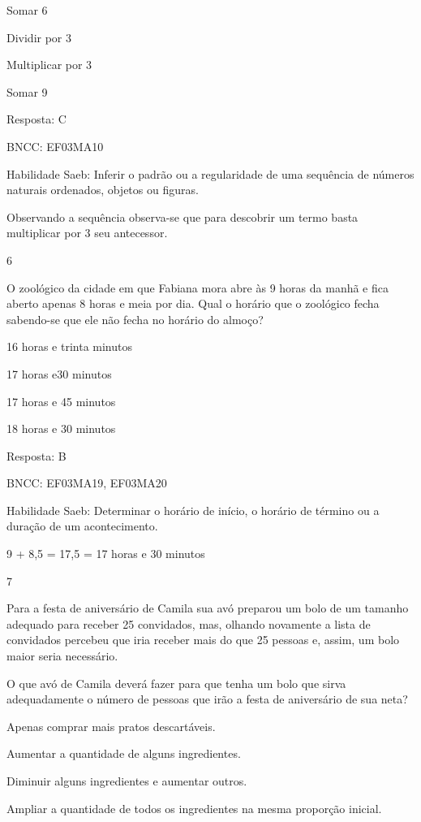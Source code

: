 \begin{escolha}
\begin{escolha}
\begin{escolha}
\item
  Somar 6
\item
  Dividir por 3
\item
  Multiplicar por 3
\item
  Somar 9
\end{escolha}

Resposta: C

BNCC: EF03MA10

Habilidade Saeb: Inferir o padrão ou a regularidade de uma sequência de
números naturais ordenados, objetos ou figuras.

Observando a sequência observa-se que para descobrir um termo basta
multiplicar por 3 seu antecessor.

\num{6}

O zoológico da cidade em que Fabiana mora abre às 9 horas da manhã e
fica aberto apenas 8 horas e meia por dia. Qual o horário que o
zoológico fecha sabendo-se que ele não fecha no horário do almoço?

\begin{escolha}
\item
  16 horas e trinta minutos
\item
  17 horas e30 minutos
\item
  17 horas e 45 minutos
\item
  18 horas e 30 minutos
\end{escolha}

Resposta: B

BNCC: EF03MA19, EF03MA20

Habilidade Saeb: Determinar o horário de início, o horário de término ou
a duração de um acontecimento.

9 + 8,5 = 17,5 = 17 horas e 30 minutos

\num{7}

Para a festa de aniversário de Camila sua avó preparou um bolo de um
tamanho adequado para receber 25 convidados, mas, olhando novamente a
lista de convidados percebeu que iria receber mais do que 25 pessoas e,
assim, um bolo maior seria necessário.

O que avó de Camila deverá fazer para que tenha um bolo que sirva
adequadamente o número de pessoas que irão a festa de aniversário de sua
neta?

\begin{escolha}
\item
  Apenas comprar mais pratos descartáveis.
\item
  Aumentar a quantidade de alguns ingredientes.
\item
  Diminuir alguns ingredientes e aumentar outros.
\item
  Ampliar a quantidade de todos os ingredientes na mesma proporção
  inicial.
\end{escolha}


\end{escolha}
\end{escolha}
